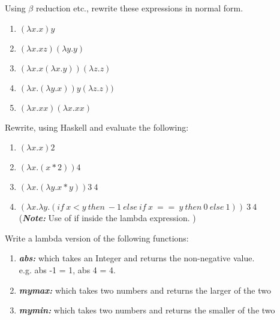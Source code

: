 \documentclass{article}
\begin{document}
\begin{Exercise}
Using $\beta$ reduction etc., rewrite these expressions in normal form.
\begin{enumerate}
\item $(\lambda x.x) y$
\item $(\lambda x.x z) (\lambda y.y)$
\item $(\lambda x.x (\lambda x.y)) (\lambda z.z)$
\item $(\lambda x.(\lambda y.x)) y (\lambda z.z))$
\item $(\lambda x.x x) (\lambda x.x x)$
\end{enumerate}
\end{Exercise}

\begin{Exercise}
Rewrite, using Haskell and evaluate the following: 
\begin{enumerate}
\item $(\lambda x.x) 2$
\item $(\lambda x . (x*2) ) 4$
\item $ (\lambda x . (\lambda y. x*y) ) 3 \ 4$
\item$ (\lambda x . \lambda y .( if \ x < y \ then \ -1\  else\  if\  x\  ==\ y\  then\  0\  else\  1)) \ 3\  4$\\
(\textbf{\textit{Note:}} Use of if inside the lambda expression. )

\end{enumerate}
\end{Exercise}
\begin{Exercise}
Write a lambda version of the following functions: 
\begin{enumerate}
\item  \textbf{\textit{abs:}} which takes an Integer and returns the non-negative value. \\
e.g. abs -1 = 1, abs 4 = 4.
\item \textbf{\textit{mymax:}} which takes two numbers and returns the larger of the two \\
\item \textbf{\textit{mymin:}} which takes two numbers and returns the smaller of the two \\
\end{enumerate}
\end{Exercise}
\end{document}
